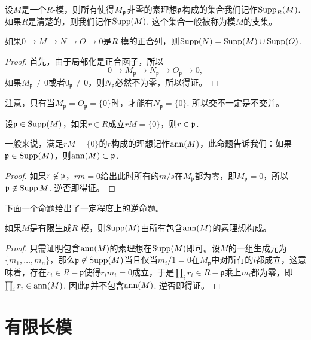 \begin{para}[支集]
	设$M$是一个$R$-模，则所有使得$M_{\mathfrak{p}}$非零的素理想$\mathfrak{p}$构成的集合我们记作$\operatorname{Supp}_R(M)$. 如果$R$是清楚的，则我们记作$\operatorname{Supp}(M)$. 这个集合一般被称为模$M$的支集。
\end{para}

\begin{lem}
	如果$0\to M\to N\to O\to 0$是$R$-模的正合列，则$\operatorname{Supp}(N)=\operatorname{Supp}(M)\cup \operatorname{Supp}(O)$.
\end{lem}

\begin{proof}
	首先，由于局部化是正合函子，所以
	\[
		0\to M_{\mathfrak p}\to N_{\mathfrak p}\to O_{\mathfrak p}\to 0,
	\]
	如果$M_{\mathfrak p}\neq 0$或者$0_{\mathfrak p}\neq 0$，则$N_{\mathfrak p}$必然不为零，所以得证。
\end{proof}

注意，只有当$M_{\mathfrak p}=O_{\mathfrak p}=\{0\}$时，才能有$N_{\mathfrak p}=\{0\}$. 所以交不一定是不交并。

\begin{lem}
	设$\mathfrak{p}\in \operatorname{Supp}(M)$，如果$r\in R$成立$rM=\{0\}$，则$r\in \mathfrak{p}$.
\end{lem}

一般来说，满足$rM=\{0\}$的$r$构成的理想记作$\operatorname{ann}(M)$，此命题告诉我们：如果$\mathfrak{p}\in\operatorname{Supp}(M)$，则$\operatorname{ann}(M)\subset \mathfrak{p}$.

\begin{proof}
	如果$r\not\in\mathfrak{p}$，$rm=0$给出此时所有的$m/s$在$M_{\mathfrak p}$都为零，即$M_{\mathfrak p}=0$，所以$\mathfrak{p}\not\in \operatorname{Supp} M$. 逆否即得证。
\end{proof}

下面一个命题给出了一定程度上的逆命题。

\begin{lem}\label{lem:3.5.28}
	如果$M$是有限生成$R$-模，则$\operatorname{Supp}(M)$由所有包含$\operatorname{ann}(M)$的素理想构成。
\end{lem}

\begin{proof}
	只需证明包含$\operatorname{ann}(M)$的素理想在$\operatorname{Supp}(M)$即可。设$M$的一组生成元为$\{m_1,\dots,m_n\}$，那么$\mathfrak p\not\in \operatorname{Supp}(M)$当且仅当$m_i/1=0$在$M_{\mathfrak p}$中对所有的$i$都成立，这意味着，存在$r_i\in  R-\mathfrak p$使得$r_im_i=0$成立，于是$\prod_i r_i\in R-\mathfrak p$乘上$m_i$都为零，即$\prod_i r_i\in \operatorname{ann}(M)$. 因此$\mathfrak{p}$并不包含$\operatorname{ann}(M)$. 逆否即得证。
\end{proof} 


\section{有限长模}

